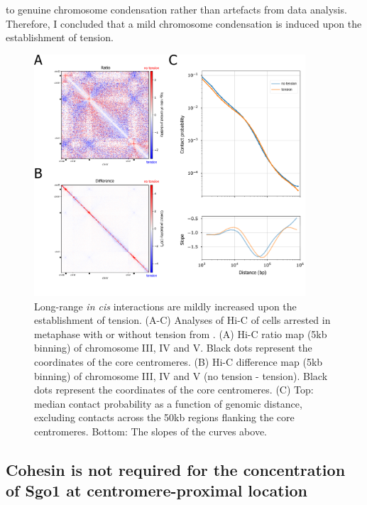 to genuine chromosome condensation rather than artefacts from data analysis. Therefore, I concluded that a mild chromosome condensation is induced upon the establishment of tension. 

\begin{figure}[htbp]
  \centering
  \includegraphics[width=0.9\textwidth]{chapter3/figures/+-tension Hi-C.pdf}
  \caption[Long-range \textit{in cis} interactions are mildly increased upon the establishment of tension]{Long-range \textit{in cis} interactions are mildly increased upon the establishment of tension. (A-C) Analyses of Hi-C of cells arrested in metaphase with or without tension from \cite{Paldi2020ConvergentPericentromeres}. (A) Hi-C ratio map (5kb binning) of chromosome III, IV and V. Black dots represent the coordinates of the core centromeres. (B) Hi-C difference map (5kb binning) of chromosome III, IV and V (no tension - tension). Black dots represent the coordinates of the core centromeres. (C) Top: median contact probability as a function of genomic distance, excluding contacts across the 50kb regions flanking the core centromeres. Bottom: The slopes of the curves above.}
  \label{fig:Hi-C+-tension}
\end{figure}

\subsection{Cohesin is not required for the concentration of Sgo1 at centromere-proximal location}

